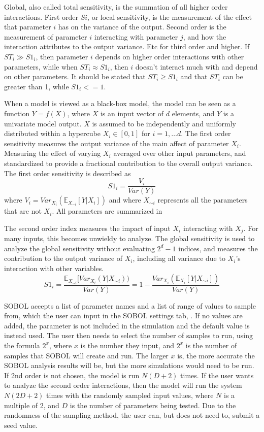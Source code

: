 Global, also called total sensitivity, is the summation of all higher order interactions. 
First order $Si$, or local sensitivity, is the measurement of the effect that parameter $i$ has on the variance of the output. 
Second order is the measurement of parameter $i$ interacting with parameter $j$, and how the interaction attributes to the output variance. 
Etc for third order and higher. 
If $ST_i \gg S1_i$, then parameter $i$ depends on higher order interactions with other parameters, while when $ST_i \approx S1_i$, then $i$ doesn't interact much with and depend on other parameters.
It should be stated that $ST_i \geq S1_i$ and that $ST_i$ can be greater than 1, while $S1_i <= 1$. 

When a model is viewed as a black-box model, the model can be seen as a function $Y=f(X)$, where $X$ is an input vector of $d$ elements, and $Y$ is a univariate model output.
$X$ is assumed to be independently and uniformly distributed within a hypercube $X_i \in [0, 1]$ for $i=1, \dots d$.
The first order sensitivity measures the output variance of the main affect of parameter $X_i$.
Measuring the effect of varying $X_i$ averaged over other input parameters, and standardized to provide a fractional contribution to the overall output variance.
The first order sensitivity is described as
\[
    S1_i = \frac{V_i}{\textit{Var}(Y)}
\] where $V_i = \textit{Var}_{X_i}(\mathbb{E}_{X_{\sim i}}[Y|X_i])$ and where $X_{\sim i}$ represents all the parameters that are not $X_i$.
All parameters are summarized in 

The second order index measures the impact of input $X_i$ interacting with $X_j$. For many inputs, this becomes unwieldy to analyze.
The global sensitivity is used to analyze the global sensitivity without evaluating $2^d-1$ indices, and measures the contribution to the output variance of $X_i$, including all variance due to $X_i$'s interaction with other variables.
\[
    S1_i = \frac{\mathbb{E}_{X_{\sim i}}[\textit{Var}_{X_i}(Y|X_{\sim i}))}{\textit{Var}(Y)} = 1 - \frac{\textit{Var}_{X_i}(\mathbb{E}_{X_i}[Y|X_{\sim i}])}{\textit{Var}(Y)}
\]

SOBOL accepts a list of parameter names and a list of range of values to sample from, which the user can input in the SOBOL settings tab, . 
If no values are added, the parameter is not included in the simulation and the default value is instead used. 
The user then needs to select the number of samples to run, using the formula $2^x$, where $x$ is the number they input, and $2^x$ is the number of samples that SOBOL will create and run.
The larger $x$ is, the more accurate the SOBOL analysis results will be, but the more simulations would need to be run.
If 2nd order is not chosen, the model is run $N(D+2)$ times.
If the user wants to analyze the second order interactions, then the model will run the system $N(2D+2)$ times with the randomly sampled input values, where $N$ is a multiple of 2, and $D$ is the number of parameters being tested.
Due to the randomness of the sampling method, the user can, but does not need to, submit a seed value. 

